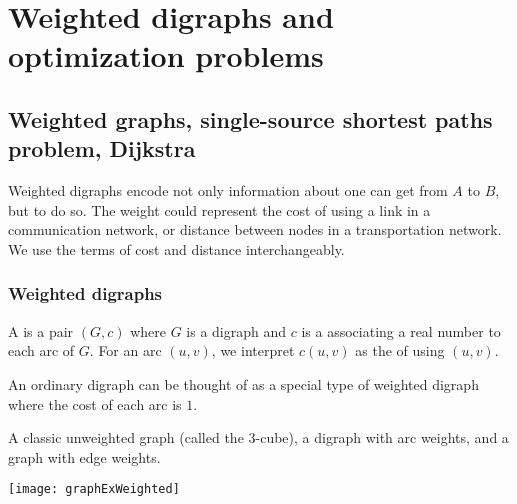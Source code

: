 \part{Weighted digraphs and optimization problems}
\label{ch:weighted}

\chapter{Weighted graphs, single-source shortest paths problem, Dijkstra} %
Weighted digraphs encode not only information about  one can get from $A$ to $B$,
but  to do so.
The weight could represent the cost of using a link in a communication network, 
or distance between nodes in a transportation network. 
We use the terms of cost and distance interchangeably.


\section{Weighted digraphs} \label{sec:weighted}
\begin{Definition}
A  is a pair $(G, c)$ where $G$ is a digraph
and $c$ is a  associating a real number to each arc of $G$. 
For an arc $(u,v)$, we interpret  $c(u, v)$ as the  of using $(u, v)$.
\end{Definition}

An ordinary digraph can be thought of as a special type of weighted digraph 
where the cost of each arc is $1$. 

\begin{Boxample} \label{ex:graphExWeighted}
A classic unweighted graph (called the $3$-cube), a digraph with arc weights, 
and a graph with edge weights.
\begin{center}
 \texttt{[image: graphExWeighted]}
\end{center}
\end{Boxample}

